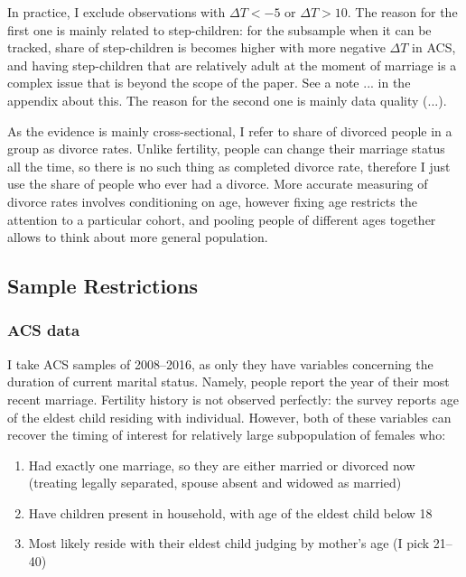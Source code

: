\documentclass[12pt,letter]{article}
\begin{document}
In practice, I exclude observations with $\Delta T < -5$ or $\Delta T > 10$. The reason for the first one is mainly related to step-children: for the subsample when it can be tracked, share of step-children is becomes higher with more negative $\Delta  T$ in ACS, and having step-children that are relatively adult at the moment of marriage is a complex issue that is beyond the scope of the paper. See a note ... in the appendix about this. The reason for the second one is mainly data quality (...).

As the evidence is mainly cross-sectional, I refer to share of divorced people in a group as divorce rates. Unlike fertility, people can change their marriage status all the time, so there is no such thing as completed divorce rate, therefore I just use the share of people who ever had a divorce. More accurate measuring of divorce rates involves conditioning on age, however fixing age restricts the attention to a particular cohort, and pooling people of different ages together allows to think about more general population.


\subsection{Sample Restrictions}
\subsubsection{ACS data}
I take ACS samples of 2008--2016, as only they have variables concerning the duration of current marital status. Namely, people report the year of their most recent marriage. Fertility history is not observed perfectly: the survey reports age of the eldest child residing with individual. However, both of these variables can recover the timing of interest for relatively large subpopulation of females who:
\begin{enumerate}
\item Had exactly one marriage, so they are either married or divorced now (treating legally separated, spouse absent and widowed as married)
\item Have children present in household, with age of the eldest child below 18
\item Most likely reside with their eldest child judging by mother's age (I pick 21--40)
\end{enumerate}
\end{document}
